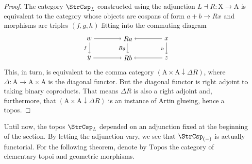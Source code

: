 \documentclass{amsart}
\newcommand{\A}{\cat{A}}
\newcommand{\X}{\cat{X}}
\newcommand{\Topos}{\cat{Topos}}
\newcommand{\cat}[1]{\mathrm{#1}}
\newcommand{\from}{\colon}
\newcommand{\csp}[3]{#1 + #3 \to #2}
\theoremstyle{remark}
\theoremstyle{definition}
\begin{document}
\begin{proof}

  The category $ \StrCsp_L $ constructed using the adjunction
  $ L \dashv R \from \X \to \A $ is equivalent to the category
  whose objects are cospans of form
  \(
      \csp{a}{Rx}{b}
  \)
  and morphisms are triples $ ( f,g,h ) $ fitting into the commuting
  diagram
  \[
    \begin{tikzpicture}
      \node (1) at (-2,1) {\( w \)};
      \node (2) at (0,1) {\( Ra \)};
      \node (3) at (2,1) {\( x \)};
      \node (4) at (-2,0) {\( y \)};
      \node (5) at (0,0) {\( Rb \)};
      \node (6) at (2,0) {\( z \)};
      \draw [->] (1) to  node [] {\scriptsize{\(  \)}} (2);
      \draw [->] (3) to node [] {\scriptsize{\(  \)}} (2);
      \draw [->] (4) to node [] {\scriptsize{\(  \)}} (5);
      \draw [->] (6) to node [] {\scriptsize{\(  \)}} (5);
      \draw [->] (1) to node [left] {\scriptsize{\( f \)}} (4);
      \draw [->] (2) to node [left] {\scriptsize{\( Rg \)}} (5);
      \draw [->] (3) to node [left] {\scriptsize{\( h \)}} (6); 
    \end{tikzpicture}
  \]
  This, in turn, is equivalent to the comma category
  $ ( \A \times \A \downarrow \Delta R ) $, where
  $ \Delta \from \A \to \A \times \A $ is the diagonal functor. But
  the diagonal functor is right adjoint to taking binary
  coproducts. That means $ \Delta R $ is also a right adjoint and,
  furthermore, that $ ( \A \times \A \downarrow \Delta R ) $ is an
  instance of Artin glueing,
  hence a topos.
%
\end{proof}

Until now, the topos $ \StrCsp_L $ depended on an adjunction fixed at
the beginning of the section.  By letting the adjunction vary, we see
that $ \StrCsp_{(-)} $ is actually functorial. For the following theorem, denote by $ \Topos $ the category of
elementary topoi and geometric morphisms.
\end{document}
